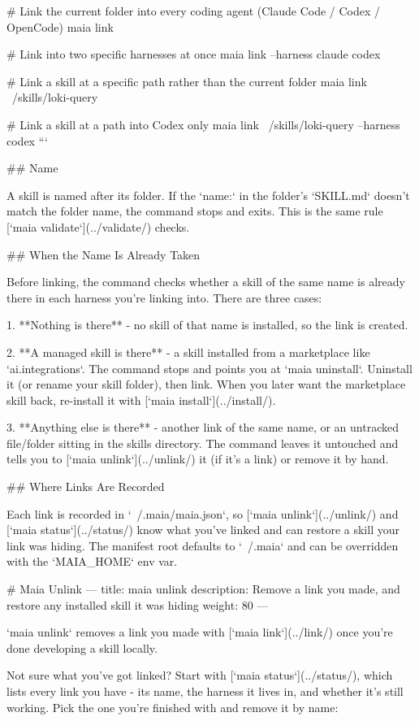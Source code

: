# Link the current folder into every coding agent (Claude Code / Codex / OpenCode)
maia link

# Link into two specific harnesses at once
maia link --harness claude codex

# Link a skill at a specific path rather than the current folder
maia link ~/skills/loki-query

# Link a skill at a path into Codex only
maia link ~/skills/loki-query --harness codex
```

## Name

A skill is named after its folder.
If the `name:` in the folder's `SKILL.md` doesn't match the folder name, the command stops and exits.
This is the same rule [`maia validate`](../validate/) checks.

## When the Name Is Already Taken

Before linking, the command checks whether a skill of the same name is already there in each harness you're linking into.
There are three cases:

1. **Nothing is there** - no skill of that name is installed, so the link is created.

2. **A managed skill is there** - a skill installed from a marketplace like `ai.integrations`.
   The command stops and points you at `maia uninstall`.
   Uninstall it (or rename your skill folder), then link.
   When you later want the marketplace skill back, re-install it with [`maia install`](../install/).

3. **Anything else is there** - another link of the same name, or an untracked file/folder sitting in the skills directory.
   The command leaves it untouched and tells you to [`maia unlink`](../unlink/) it (if it's a link) or remove it by hand.

## Where Links Are Recorded

Each link is recorded in `~/.maia/maia.json`, so [`maia unlink`](../unlink/) and [`maia status`](../status/) know what you've linked and can restore a skill your link was hiding.
The manifest root defaults to `~/.maia` and can be overridden with the `MAIA_HOME` env var.


# Maia Unlink 
---
title: maia unlink
description: Remove a link you made, and restore any installed skill it was hiding
weight: 80
---

`maia unlink` removes a link you made with [`maia link`](../link/) once you're done developing a skill locally.

Not sure what you've got linked?
Start with [`maia status`](../status/), which lists every link you have - its name, the harness it lives in, and whether it's still working.
Pick the one you're finished with and remove it by name:

